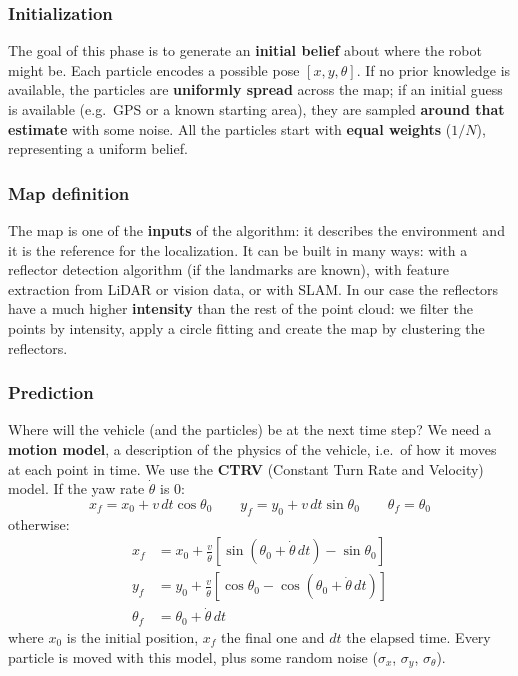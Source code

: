 \subsubsection{Initialization}
The goal of this phase is to generate an \textbf{initial belief} about where the robot might be. Each particle encodes a possible pose $[x, y, \theta]$.
If no prior knowledge is available, the particles are \textbf{uniformly spread} across the map; if an initial guess is available (e.g.\ GPS or a known starting area), they are sampled \textbf{around that estimate} with some noise.
All the particles start with \textbf{equal weights} ($1/N$), representing a uniform belief.

\subsubsection{Map definition}
The map is one of the \textbf{inputs} of the algorithm: it describes the environment and it is the reference for the localization.
It can be built in many ways: with a reflector detection algorithm (if the landmarks are known), with feature extraction from LiDAR or vision data, or with SLAM.
In our case the reflectors have a much higher \textbf{intensity} than the rest of the point cloud: we filter the points by intensity, apply a circle fitting and create the map by clustering the reflectors.

\subsubsection{Prediction}
Where will the vehicle (and the particles) be at the next time step? We need a \textbf{motion model}, a description of the physics of the vehicle, i.e.\ of how it moves at each point in time.
We use the \textbf{CTRV} (Constant Turn Rate and Velocity) model. If the yaw rate $\dot{\theta}$ is 0:
\[
x_f = x_0 + v\,dt \cos\theta_0 \qquad y_f = y_0 + v\,dt \sin\theta_0 \qquad \theta_f = \theta_0
\]
otherwise:
\[
\begin{aligned}
x_f &= x_0 + \frac{v}{\dot{\theta}}\left[\sin(\theta_0 + \dot{\theta}\,dt) - \sin\theta_0\right] \\
y_f &= y_0 + \frac{v}{\dot{\theta}}\left[\cos\theta_0 - \cos(\theta_0 + \dot{\theta}\,dt)\right] \\
\theta_f &= \theta_0 + \dot{\theta}\,dt
\end{aligned}
\]
where $x_0$ is the initial position, $x_f$ the final one and $dt$ the elapsed time.
Every particle is moved with this model, plus some random noise ($\sigma_x$, $\sigma_y$, $\sigma_\theta$).

